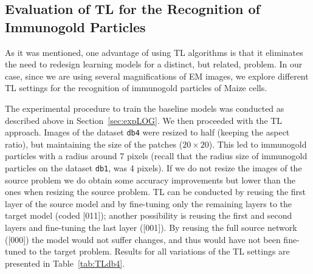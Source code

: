 \documentclass[a4paper,11pt]{article}
\newcommand{\1}{\mathbbm{1}}
\newcommand{\tref}[1]{Table~\ref{#1}}
\newcommand{\sref}[1]{Section~\ref{#1}}
\newcommand{\db}[1]{\texttt{#1}}
\theoremstyle{plain}
\begin{document}
\subsection{Evaluation of TL for the Recognition of Immunogold Particles}\label{sec:expTL}
As it was mentioned, one advantage of using \ac{TL} algorithms is that it eliminates the need to redesign learning models for a distinct, but related, problem. In our case, since we are using several magnifications of \ac{EM} images, we explore different \ac{TL} settings for the recognition of immunogold particles of Maize cells.

The experimental procedure to train the baseline models was conducted as described above in \sref{sec:expLOG}. We then proceeded with the \ac{TL} approach. Images of the dataset \db{db4} were resized to half (keeping the aspect ratio), but maintaining the size of the patches ($20\times 20$). This led to immunogold particles with a radius around 7 pixels (recall that the radius size of immunogold particles on the dataset \db{db1}, was 4 pixels). If we do not resize the images of the source problem we do obtain some accuracy improvements but lower than the ones when resizing the source problem.
\ac{TL} can be conducted by reusing the first layer of the source model and by fine-tuning only the remaining layers to the target model (coded [011]); another possibility is reusing the first and second layers and fine-tuning the last layer ([001]). By reusing the full source network ([000]) the model would not suffer changes, and thus would have not been fine-tuned to the target problem. Results for all variations of the \ac{TL} settings are presented in \tref{tab:TLdb4}.
\end{document}
